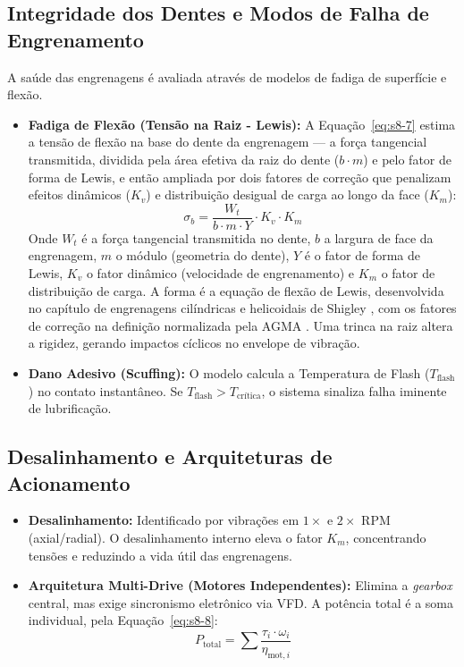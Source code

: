 \documentclass[12pt,a4paper]{article}
\numberwithin{equation}{section}
\numberwithin{table}{section}
\numberwithin{figure}{section}
\begin{document}
{	\subsection{\textbf{Integridade dos Dentes e Modos de Falha de Engrenamento}}
	A saúde das engrenagens é avaliada através de modelos de fadiga de superfície e flexão.
	\begin{itemize}
		\item \textbf{Fadiga de Flexão (Tensão na Raiz - Lewis):} A Equação~\eqref{eq:s8-7} estima a tensão de flexão na base do dente da engrenagem — a força tangencial transmitida, dividida pela área efetiva da raiz do dente ($b \cdot m$) e pelo fator de forma de Lewis, e então ampliada por dois fatores de correção que penalizam efeitos dinâmicos ($K_v$) e distribuição desigual de carga ao longo da face ($K_m$):
		\begin{equation}\label{eq:s8-7}
 \sigma_b = \frac{W_t}{b \cdot m \cdot Y} \cdot K_v \cdot K_m
\end{equation}
		Onde $W_t$ é a força tangencial transmitida no dente, $b$ a largura de face da engrenagem, $m$ o módulo (geometria do dente), $Y$ é o fator de forma de Lewis, $K_v$ o fator dinâmico (velocidade de engrenamento) e $K_m$ o fator de distribuição de carga. A forma é a equação de flexão de Lewis, desenvolvida no capítulo de engrenagens cilíndricas e helicoidais de Shigley \cite[Cap.~14]{shigley}, com os fatores de correção na definição normalizada pela AGMA \cite{agma2001}. Uma trinca na raiz altera a rigidez, gerando impactos cíclicos no envelope de vibração.
		\item \textbf{Dano Adesivo (Scuffing):} O modelo calcula a Temperatura de Flash ($T_{\text{flash}}$) no contato instantâneo. Se $T_{\text{flash}} > T_{\text{crítica}}$, o sistema sinaliza falha iminente de lubrificação.
	\end{itemize}
	
	\subsection{\textbf{Desalinhamento e Arquiteturas de Acionamento}}
	\begin{itemize}
		\item \textbf{Desalinhamento:} Identificado por vibrações em $1 \times$ e $2 \times$ RPM (axial/radial). O desalinhamento interno eleva o fator $K_m$, concentrando tensões e reduzindo a vida útil das engrenagens.
		\item \textbf{Arquitetura Multi-Drive (Motores Independentes):} Elimina a \textit{gearbox} central, mas exige sincronismo eletrônico via VFD. A potência total é a soma individual, pela Equação~\eqref{eq:s8-8}:
		\begin{equation}\label{eq:s8-8}
 P_{\text{total}} = \sum \frac{\tau_i \cdot \omega_i}{\eta_{\text{mot},i}} 
\end{equation}
	\end{itemize}
	
}
\end{document}
